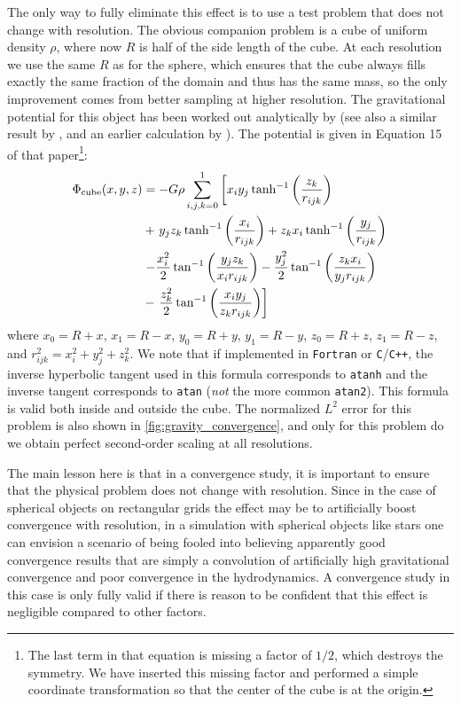 \documentclass[12pt]{article}
\begin{document}
The only way to fully eliminate this effect is to use a test problem that
does not change with resolution. The obvious companion problem is a cube of
uniform density $\rho$, where now $R$ is half of the side length of
the cube. At each resolution we use the same $R$ as for the sphere,
which ensures that the cube always fills exactly the same fraction of
the domain and thus has the same mass, so the only improvement comes
from better sampling at higher resolution. The gravitational potential for this
object has been worked out analytically by \citet{waldvogel:1976} (see
also a similar result by \citet{hummer:1996}, and an earlier calculation
by \citet{macmillan:1958}). The potential is given in
Equation 15 of that paper\footnote{The last term in that equation is missing a factor of
$1/2$, which destroys the symmetry. We have inserted this missing factor and
performed a simple coordinate transformation so that the center of
the cube is at the origin.}:
\begin{align}
  \Phi_{\text{cube}}(x,y,z) &= -G\rho\sum_{i,j,k=0}^1\left[x_i y_j\, \text{tanh}^{-1}\left(\frac{z_k}{r_{ijk}}\right)\right. \notag \\
  &+ \left. y_j z_k\, \text{tanh}^{-1}\left(\frac{x_i}{r_{ijk}}\right) + z_k x_i\, \text{tanh}^{-1}\left(\frac{y_j}{r_{ijk}}\right) \right.\notag \\
  &\left. - \frac{x_i^2}{2}\,\text{tan}^{-1}\left(\frac{y_j z_k}{x_i r_{ijk}}\right) - \frac{y_j^2}{2}\,\text{tan}^{-1}\left(\frac{z_k x_i}{y_j r_{ijk}}\right) \right. \notag \\
  &- \left. \frac{z_k^2}{2}\,\text{tan}^{-1}\left(\frac{x_i y_j}{z_k r_{ijk}}\right)\right]
\end{align}
where $x_0 = R + x$, $x_1 = R - x$, $y_0 = R + y$,
$y_1 = R - y$, $z_0 = R + z$, $z_1 = R - z$,
and $r^2_{ijk} = x_i^2 + y_j^2 + z_k^2$. We note that if implemented in
\texttt{Fortran} or \texttt{C}/\texttt{C++}, the inverse hyperbolic tangent used in this formula corresponds to
\texttt{atanh} and the inverse tangent corresponds to \texttt{atan} (\textit{not} the more common
\texttt{atan2}). This formula is valid both inside and outside the
cube. The normalized $L^2$ error for this problem is also shown
in \autoref{fig:gravity_convergence}, and only for this problem
do we obtain perfect second-order scaling at all resolutions.

The main lesson here is that in a convergence study, it is important
to ensure that the physical problem does not change with
resolution. Since in the case of spherical objects on rectangular
grids the effect may be to artificially boost convergence with resolution,
in a simulation with spherical objects like stars one can envision a
scenario of being fooled into believing apparently good convergence
results that are simply a convolution of artificially high
gravitational convergence and poor convergence in the hydrodynamics. A
convergence study in this case is only fully valid if there is reason
to be confident that this effect is negligible compared to other
factors.
\end{document}
